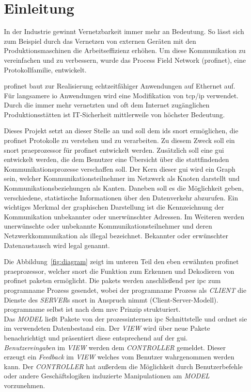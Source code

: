 \chapter{Einleitung}

In der Industrie gewinnt Vernetzbarkeit immer mehr an Bedeutung. So lässt sich zum Beispiel durch das Vernetzen von externen Geräten mit den Produktionsmaschinen die Arbeitseffizienz erhöhen. Um diese Kommunikation zu vereinfachen und zu verbessern, wurde das Process Field Network (\gls{profinet}), eine Protokollfamilie, entwickelt.\par
\gls{profinet} baut zur Realisierung echtzeitfähiger Anwendungen auf Ethernet auf. Für langsamere \gls{io} Anwendungen wird eine Modifikation von \gls{tcp}/\gls{ip} verwendet. Durch die immer mehr vernetzten und oft dem Internet zugänglichen Produktionsstätten ist IT-Sicherheit mittlerweile von höchster Bedeutung. \par
Dieses Projekt setzt an dieser Stelle an und soll dem \gls{ids} \gls{snort} ermöglichen, die \gls{profinet} Protokolle zu verstehen und zu verarbeiten. Zu diesem Zweck soll ein \gls{snort} \gls{praeprozessor} für \gls{profinet} entwickelt werden. Zusätzlich soll eine \gls{gui} entwickelt werden, die dem Benutzer eine Übersicht über die stattfindenden Kommunikationsprozesse verschaffen soll. Der Kern dieser \gls{gui} wird ein Graph sein, welcher Kommunikationsteilnehmer im Netzwerk als Knoten darstellt und Kommunikationsbeziehungen als Kanten. Daneben soll es die Möglichkeit geben, verschiedene, statistische Informationen über den Datenverkehr abzurufen.
Ein wichtiges Merkmal der graphischen Darstellung ist die Kennzeichnung der Kommunikation unbekannter oder unerwünschter Adressen. Im Weiteren werden unerwünschte oder unbekannte Kommunikationsteilnehmer und deren Netzwerkkommunikation als illegal bezeichnet. Bekannter oder erwünschter Datenaustausch wird legal genannt.\par
Die Abbildung~\ref{fig:diagram} zeigt im unteren Teil den eben erwähnten \gls{profinet} \gls{praeprozessor}, welcher \gls{snort} die Funktion zum Erkennen und Dekodieren von \gls{profinet} \glspl{paket}n ermöglicht. Die \glspl{paket} werden anschließend per \gls{ipc} zum \gls{programname} Prozess gesendet, wobei der \gls{programname} Prozess als \textit{CLIENT} die Dienste des \textit{SERVER}s \gls{snort} in Anspruch nimmt (Client-Server-Modell).\\
\Gls{programname} selbst ist nach dem \gls{mvc} Prinzip strukturiert.\\
Das \textit{MODEL} ließt Pakete von der prozessinternen \gls{ipc} Schnittstelle und ordnet sie im verwendeten Datenbestand ein. Der \textit{VIEW} wird über neue Pakete benachrichtigt und präsentiert diese entsprechend auf der \gls{gui}.\\
\textit{Benutzereingaben} im \textit{VIEW} werden dem \textit{CONTROLLER} gemeldet. Dieser erzeugt ein \textit{Feedback} im \textit{VIEW} welches vom Benutzer wahrgenommen werden kann. Der \textit{CONTROLLER} hat außerdem die Möglichkeit durch Benutzerbefehle oder andere Geschäftslogiken induzierte Manipulationen am \textit{MODEL} vorzunehmen.

